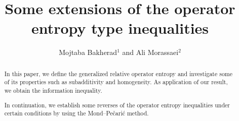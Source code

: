 \documentclass[12pt, reqno]{amsart}
\theoremstyle{definition}
\theoremstyle{remark}
\numberwithin{equation}{section}
\begin{document}
\title [Some extensions of the operator entropy type inequalities]{Some extensions of the operator entropy type inequalities}

\author[M. Bakherad, A. Morassaei]{Mojtaba Bakherad$^1$ and Ali Morassaei$^2$}

\address{$^1$Department of Mathematics, Faculty of Mathematics, University of Sistan and Baluchestan, Zahedan, Iran.}
\address{$^2$Department of Mathematics, Faculty of Sciences, University of Zanjan, University Blvd., Zanjan 45371-38791, Iran.}

\begin{abstract}
In this paper, we define the generalized relative operator entropy and investigate some of its properties such as subadditivity and homogeneity. As application of our result, we obtain the information inequality.

In continuation, we  establish some reverses of the operator entropy inequalities under certain conditions by using the Mond--Pe\v{c}ari\'c method.
\end{abstract}

\maketitle
\end{document}
